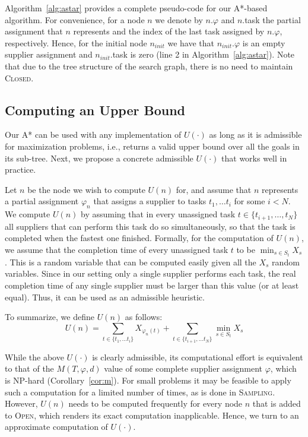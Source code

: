 \documentclass[letterpaper]{article} %
\newcommand{\astar}{\textsc{A*}\xspace}
\newcommand{\sampling}{\textsc{Sampling}\xspace}
\newcommand{\closed}{\textsc{Closed}\xspace}
\newcommand{\open}{\textsc{Open}\xspace}
\begin{document}
Algorithm~\ref{alg:astar} provides a complete pseudo-code for our \astar-based algorithm. For convenience, for a node $n$ we denote by $n.\varphi$ and $n$.task
the partial assignment that $n$ represents and the index of the last task assigned by $n.\varphi$, respectively. Hence, for the initial node $n_{init}$ we have that $n_{init}.\varphi$ is an empty supplier assignment and $n_{init}.$task is zero (line 2 in Algorithm~\ref{alg:astar}). Note that due to the tree structure of the search graph, there is no need to maintain \closed.


\subsection{Computing an Upper Bound}

Our \astar can be used with any implementation of $U(\cdot)$ as long as it is admissible for maximization problems, i.e., returns a valid upper bound over all the goals in its sub-tree. Next, we propose a concrete admissible $U(\cdot)$ that works well in practice.

Let $n$ be the node we wish to compute $U(n)$ for, and assume that $n$ represents a partial assignment $\varphi_n$ that assigns a supplier to tasks $t_1,\ldots t_i$ for some $i<N$.
We compute $U(n)$ by assuming that in every unassigned task $t\in \{t_{i+1},\ldots,t_{N}\}$
all suppliers that can perform this task do so simultaneously, so that the task is completed
when the fastest one finished. Formally, for the computation of $U(n)$, we assume that the completion time of every unassigned task $t$ to be $\min_{s\in S_t} X_s$. This is a random variable that can be computed easily given all the $X_s$ random variables. Since in our setting only a single supplier performs each task, the real completion time of any single supplier must be larger than this value (or at least equal). Thus, it can be used as an admissible heuristic.

To summarize, we define $U(n)$ as follows:
\begin{equation}
U(n)=\sum_{t\in \{t_1,\ldots t_i\}} X_{\varphi_n(t)} + \sum_{t\in \{t_{i+1},\ldots t_{N}\}} \min_{s\in S_t} X_s
\label{eq:heuristic}
\end{equation}




While the above $U(\cdot)$ is clearly admissible, its computational effort is equivalent to that of the $M(T,\varphi,d)$ value of some complete supplier assignment $\varphi$, which is NP-hard (Corollary~\ref{cor:m}). For small problems it may be feasible to apply such a computation for a limited number of times, as is done in \sampling. However, $U(n)$ needs to be computed frequently for every node $n$ that is added to \open, which renders its exact computation inapplicable. Hence, we turn to an approximate computation of $U(\cdot)$.
\end{document}
